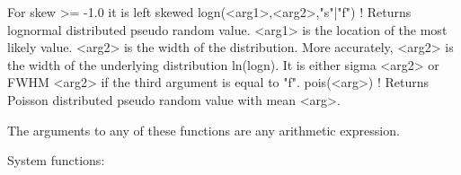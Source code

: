\begin{MacVerbatim}
                                  For skew >= -1.0 it is left  skewed
logn(<arg1>,<arg2>{,"s"|"f"})   ! Returns lognormal distributed pseudo
                                  random value. <arg1> is the location
                                  of the most likely value.
                                  <arg2> is the width of the distribution.
                                  More accurately, <arg2> is the width of
                                  the underlying distribution ln(logn).
                                  It is either sigma <arg2> or FWHM <arg2>
                                  if the third argument is equal to "f".
pois(<arg>)                     ! Returns Poisson  distributed pseudo
                                  random value with mean <arg>.
\end{MacVerbatim}
The arguments to any of these functions are any arithmetic expression. 
\par
System functions: 
\par
